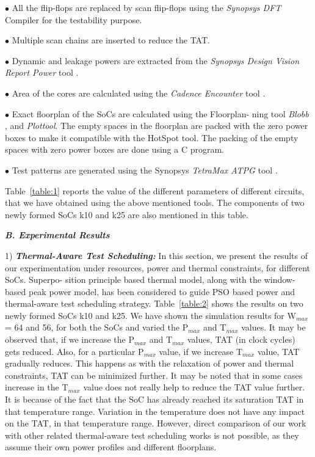 \documentclass[conference]{IEEEtran}
\begin{document}
$\bullet$ All the flip-flops are replaced by scan flip-flops using the
\textit{Synopsys DFT} Compiler for the testability purpose.

$\bullet$ Multiple scan chains are inserted to reduce the TAT.

$\bullet$ Dynamic and leakage powers are extracted from the \textit{Synopsys
Design Vision Report Power} tool \cite{lettnin2004synthesis}.

$\bullet$ Area of the cores are calculated using the \textit{Cadence Encounter}
tool \cite{davis2008big}.

$\bullet$ Exact floorplan of the SoCs are calculated using the Floorplan-
ning tool \textit{Blobb} \cite{chan2004practical} , \cite{kapur2013test} and \textit{Plottool}. The empty spaces in
the floorplan are packed with the zero power boxes to make it
compatible with the HotSpot tool. The packing of the empty
spaces with zero power boxes are done using a C program.

$\bullet$ Test patterns are generated using the Synopsys \textit{TetraMax
ATPG} tool \cite{weed2006chip}.

	\par
	Table~\ref{table:1} reports the value of the different parameters
of different circuits, that we have obtained using the above
mentioned tools. The components of two newly formed SoCs
k10 and k25 are also mentioned in this table.


\textbf{\textit{B. Experimental Results}}

1) \textbf{\textit{Thermal-Aware Test Scheduling:}} In this section, we
present the results of our experimentation under resources,
power and thermal constraints, for different SoCs. Superpo-
sition principle based thermal model, along with the window-
based peak power model, has been considered to guide PSO
based power and thermal-aware test scheduling strategy. Table~\ref{table:2} shows the results on two newly formed SoCs k10 and k25.
We have shown the simulation results for W$_{max}$ = 64 and 56,
for both the SoCs and varied the P$_{max}$ and T$_{max}$ values. It may
be observed that, if we increase the P$_{max}$ and T$_{max}$ values,
TAT (in clock cycles) gets reduced. Also, for a particular P$_{max}$
value, if we increase T$_{max}$ value, TAT gradually reduces.
This happens as with the relaxation of power and thermal
constraints, TAT can be minimized further. It may be noted
that in some cases increase in the T$_{max}$ value does not really
help to reduce the TAT value further. It is because of the fact
that the SoC has already reached its saturation TAT in that
temperature range. Variation in the temperature does not have
any impact on the TAT, in that temperature range. However,
direct comparison of our work with other related thermal-aware
test scheduling works is not possible, as they assume their own
power profiles and different floorplans.
\end{document}
